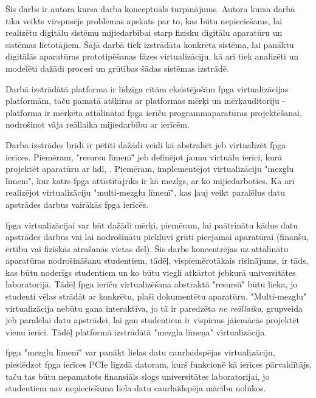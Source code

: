 Šis darbs ir autora kursa darba konceptuāls turpinājums. Autora kursa darbā tika
veikts virspusējs problēmas apskats par to, kas būtu nepieciešams, lai realizētu
digitālu sistēmu mijiedarbībai starp fizisku digitālu aparatūru un sistēmas
lietotājiem. Šājā darbā tiek izstrādāta konkrēta sistēma, lai panāktu digitālās
aparatūras prototipēšanas fāzes virtualizāciju, kā arī tiek analizēti un
modelēti dažādi procesi un grūtības šādas sistēmas izstrādē.
\cite{VeinbahsKrisjanis2021}

Darbā izstrādātā platforma ir līdzīga citām eksistējošām \gls{fpga}
virtualizācijas platformām, taču pamatā atšķiras ar platformas mērķi un
mērķauditoriju - platforma ir mērķēta attālinātai \gls{fpga} ierīču
programmaparatūras projektēšanai, nodrošinot vāja reāllaika mijiedarbību ar
ierīcēm.

Darba izstrādes brīdī ir pētīti dažādi veidi kā abstrahēt jeb virtualizēt
\gls{fpga} ierīces. \cite[para. I]{VaishnavAnuj2018} Piemēram, "resursu līmenī"
jeb definējot jaunu virtuālu ierīci, kurā projektēt aparatūru ar \gls{hdl},
\cite[para III]{VaishnavAnuj2018}. Piemēram, implementējot virtualizāciju
"mezglu līmenī", kur katrs \gls{fpga} attīstītājrīks ir kā mezlgs, ar ko
mijiedarboties. \cite[para IV]{VaishnavAnuj2018} Kā arī realizējot
virtualizāciju "multi-mezglu līmenī", kas ļauj veikt paralēlus datu apstrādes
darbus vairākās \gls{fpga} ierīcēs. \cite[para V]{VaishnavAnuj2018}

\gls{fpga} virtualizācijai var būt dažādi mērķi, piemēram, lai paātrinātu kādus
datu apstrādes darbus vai lai nodrošinātu piekļuvi grūti pieejamai aparatūrai
(finanšu, ērtību vai fiziskās atrašanās vietas dēļ). Šis darbs koncentrējas uz
attālinātu aparatūras nodrošināšanu studentiem, tādēļ, vispiemērotākais
risinājums, ir tāds, kas būtu noderīgs studentiem un ko būtu viegli atkārtot
jebkurā universitātes laboratorijā. Tādēļ \gls{fpga} ierīču virtualizēšana
abstraktā "resursā" būtu lieka, jo studenti vēlas strādāt ar konkrētu, plaši
dokumentētu aparatūru. "Multi-mezglu" virtualizācija nebūtu gana interaktīva, jo
tā ir paredzēta \textit{ne reāllaika}, grupveida jeb paralēlai datu apstrādei, lai
gan studentiem ir vispirms jāiemācās projektēt vienu ierīci. Tādēļ platformā
izstrādātā "mezgla līmeņa" virtualizācija. 

\gls{fpga} "mezglu līmenī" var panākt lielas datu caurlaidspējas virtualizāciju,
pieslēdzot \gls{fpga} ierīces PCIe ligzdā datoram, kurš funkcionē kā ierīces
pārvaldītājs, taču tas būtu nepamatots finansiāls slogs universitātes
laboratorijai, jo studentiem nav nepieciešama liela datu caurlaidspēja mācību
nolūkos. \cite{WangWei2013} \cite{AsiaticiMikhail2017} 

